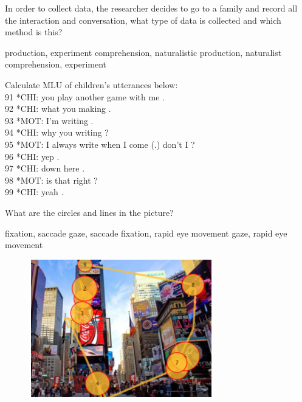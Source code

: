 \documentclass[legalpaper, 12pt, addpoints, answers]{exam}
\begin{document}
\begin{questions}
 \question In order to collect data, the researcher decides to go to a family and record all the interaction and conversation, what type of data is collected and which method is this? 
 
        \begin{choices}
            \choice production, experiment
            \choice comprehension, naturalistic
            \choice production, naturalist
            \choice comprehension, experiment
        \end{choices}
\vspace{0.15in}

\question Calculate MLU of children's utterances below:\\
91  *CHI:	you play another game with me .\\
92	*CHI:	what you making .\\
93	*MOT:	I'm writing .\\
94	*CHI:	why you writing ?\\
95	*MOT:	I always write when I come (.) don't I ?\\
96	*CHI:	yep .\\
97	*CHI:	down here .\\
98	*MOT:	is that right ?\\
99	*CHI:	yeah .\\


        \begin{oneparchoices}
        \end{oneparchoices}
\vspace{0.10in}

\question What are the circles and lines in the picture?

\begin{choices}
      \choice fixation, saccade
      \choice gaze, saccade
      \choice fixation, rapid eye movement
      \choice gaze, rapid eye movement
\end{choices}
   \begin{figure}[h]
        \centering
        \includegraphics[height = 6cm, width = 8cm]{Fixation-sequences.png}
    \end{figure}
    

\end{questions}
\end{document}
